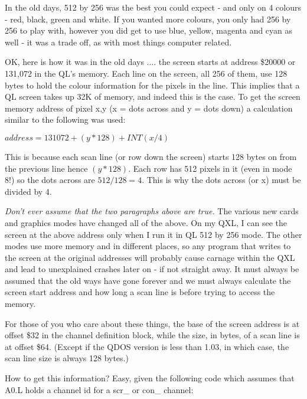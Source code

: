 In the old days, 512 by 256 was the best you could expect -{} and only
    on 4 colours -{} red, black, green and white. If you wanted more colours,
    you only had 256 by 256 to play with, however you did get to use blue,
    yellow, magenta and cyan as well -{} it was a trade off, as with most things
    computer related.

OK, here is how it was in the old days .... the screen starts at
    address \$20000 or 131,072 in the QL's memory. Each line on the screen, all
    256 of them, use 128 bytes to hold the colour information for the pixels
    in the line. This implies that a QL screen takes up 32K of memory, and
    indeed this is the case. To get the screen memory address of pixel x,y (x
    = dots across and y = dots down) a calculation similar to the following
    was used:

$address = 131072 + (y * 128) + INT(x / 4)$

This is because each scan line (or row down the screen) starts 128
    bytes on from the previous line hence $(y * 128)$. Each row has 512 pixels
    in it (even in mode 8!) so the dots across are $512/128 = 4$. This is why
    the dots across (or x) must be divided by 4.

\begin{warning}
\emph{Don't ever assume that the two paragraphs above are
      true.} The various new cards and graphics modes have changed
      all of the above. On my QXL, I can see the screen at the above address
      only when I run it in QL 512 by 256 mode. The other modes use more
      memory and in different places, so any program that writes to the screen
      at the original addresses will probably cause carnage within the QXL and
      lead to unexplained crashes later on -{} if not straight away. It must
      always be assumed that the old ways have gone forever and we must always
      calculate the screen start address and how long a scan line is before
      trying to access the memory.
\end{warning}

For those of you who care about these things, the base of the screen
    address is at offset \$32 in the channel definition block, while the size,
    in bytes, of a scan line is at offset \$64. (Except if the QDOS version is less
    than 1.03, in which case, the scan line size is always 128 bytes.)

How to get this information? Easy, given the following code which
    assumes that A0.L holds a channel id for a scr\_ or con\_ channel:

